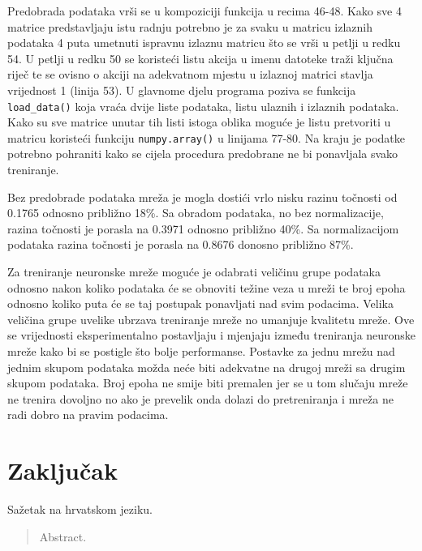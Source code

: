 \documentclass[times, utf8, diplomski]{fer}
\begin{document}
Predobrada podataka vrši se u kompoziciji funkcija u recima 46-48. Kako sve 4 matrice predstavljaju
istu radnju potrebno je za svaku u matricu izlaznih podataka 4 puta umetnuti ispravnu izlaznu matricu
što se vrši u petlji u redku 54. U petlji u redku 50 se koristeći listu akcija u imenu datoteke traži
ključna riječ te se ovisno o akciji na adekvatnom mjestu u izlaznoj matrici stavlja vrijednost 1
(linija 53). U glavnome djelu programa poziva se funkcija \texttt{load\_data()} koja vraća dvije liste
podataka, listu ulaznih i izlaznih podataka. Kako su sve matrice unutar tih listi istoga oblika
moguće je listu pretvoriti u matricu koristeći funkciju \texttt{numpy.array()} u linijama 77-80.
Na kraju je podatke potrebno pohraniti kako se cijela procedura predobrane ne bi ponavljala svako
treniranje.

Bez predobrade podataka mreža je mogla dostići vrlo nisku razinu točnosti od 0.1765 odnosno približno 18\%.
Sa obradom podataka, no bez normalizacije, razina točnosti je porasla na 0.3971 odnosno približno 40\%.
Sa normalizacijom podataka razina točnosti je porasla na 0.8676 donosno približno 87\%.

Za treniranje neuronske mreže moguće je odabrati veličinu grupe podataka odnosno nakon koliko podataka će se
obnoviti težine veza u mreži te broj epoha odnosno koliko puta će se taj postupak ponavljati nad svim podacima.
Velika veličina grupe uvelike ubrzava treniranje mreže no umanjuje kvalitetu mreže. Ove se vrijednosti
eksperimentalno postavljaju i mjenjaju između treniranja neuronske mreže kako bi se postigle što bolje
performanse. Postavke za jednu mrežu nad jednim skupom podataka možda neće biti adekvatne na drugoj mreži
sa drugim skupom podataka. Broj epoha ne smije biti premalen jer se u tom slučaju mreže ne trenira dovoljno
no ako je prevelik onda dolazi do pretreniranja i mreža ne radi dobro na pravim podacima.


\chapter{Zaključak}





\begin{sazetak}
Sažetak na hrvatskom jeziku.

\end{sazetak}

\begin{abstract}
Abstract.

\end{abstract}
\end{document}
